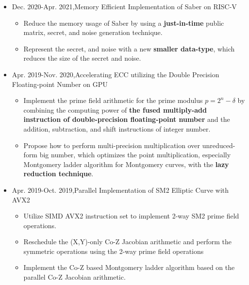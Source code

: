 \documentclass[letterpaper,11pt]{article}
\newcommand{\resitem}[1]{\item #1 \vspace{-2pt}}
\begin{document}
\begin{itemize}
	\item
	Dec. 2020-Apr. 2021,\quad Memory Efficient Implementation of Saber on RISC-V
	\begin{itemize}
		\resitem{Reduce the memory usage of Saber by using a \textbf{just-in-time} public matrix, secret, and noise generation technique.}
		\resitem{Represent the secret, and noise with a new \textbf{smaller data-type}, which reduces the size of the secret and noise.}
	\end{itemize}
	\item
	Apr. 2019-Nov. 2020,\quad Accelerating ECC utilizing the Double Precision Floating-point Number on GPU
	\begin{itemize}
		\resitem{Implement the prime field arithmetic for the prime modulus $p=2^n-\delta$ by combining the computing power of \textbf{the fused multiply-add instruction of double-precision floating-point number} and the addition, subtraction, and shift instructions of integer number. }
		\resitem{Propose how to perform multi-precision multiplication over unreduced-form big number, which optimizes the point multiplication, especially Montgomery ladder algorithm for Montgomery curves, with the \textbf{lazy reduction technique}.}
	\end{itemize}
	\item
	Apr. 2019-Oct. 2019,\quad Parallel Implementation of SM2 Elliptic Curve with AVX2
	\begin{itemize}
		\resitem{Utilize SIMD AVX2 instruction set to implement 2-way SM2 prime field operations.}

		\resitem{Reschedule the (X,Y)-only Co-Z Jacobian arithmetic and perform the symmetric operations using the 2-way prime field operations}

		\resitem{Implement the Co-Z based Montgomery ladder algorithm based on the parallel Co-Z Jacobian arithmetic.}


\end{itemize}
\end{itemize}
\end{document}
